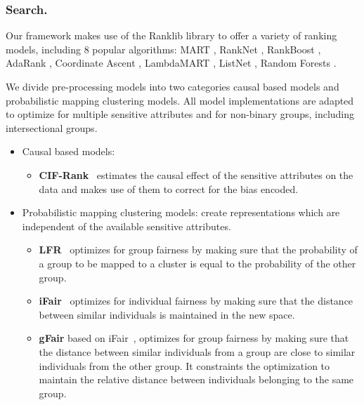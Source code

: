 \subsubsection{Search.}
Our framework makes use of the Ranklib library to offer a variety of ranking models, including 8 popular algorithms: MART \cite{friedman2001greedy}, RankNet \cite{burges2005learning}, RankBoost \cite{freund2003efficient}, AdaRank \cite{xu2007adarank}, Coordinate Ascent \cite{metzler2007linear}, LambdaMART \cite{wu2010adapting}, ListNet \cite{cao2007learning}, Random Forests \cite{breiman2001random}. 

We divide pre-processing models into two categories causal based models and probabilistic mapping clustering models. All model implementations are adapted to optimize for multiple sensitive attributes and for non-binary groups, including intersectional groups.
\begin{itemize}[leftmargin=*]
    \item Causal based models:
    \begin{itemize}[leftmargin=*]
        \item \textbf{CIF-Rank}~\cite{yang2020causal} estimates the causal effect of the sensitive attributes on the data and makes use of them to correct for the bias encoded.
    \end{itemize}
    \item Probabilistic mapping clustering models:
    create representations which are independent of the available sensitive attributes.
    \begin{itemize}[leftmargin=*]
        \item \textbf{LFR}~\cite{zemel2013learning} optimizes for group fairness by making sure that the probability of a group to be mapped to a cluster is equal to the probability of the other group. 
        \item \textbf{iFair}~\cite{lahoti2019ifair} optimizes for individual fairness by making sure that the distance between similar individuals is maintained in the new space. 
        \item \textbf{gFair} based on iFair~\cite{lahoti2019ifair}, optimizes for group fairness by making sure that the distance between similar individuals from a group are close to similar individuals from the other group. It constraints the optimization to maintain the relative distance between individuals belonging to the same group.
    \end{itemize}
\end{itemize}
        
